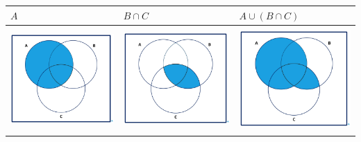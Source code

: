 \documentclass[
  letterpaper,
  DIV=11,
  numbers=noendperiod]{scrreprt}
\begin{document}
\begin{longtable}[]{@{}
  >{\centering\arraybackslash}p{}
  >{\centering\arraybackslash}p{}
  >{\centering\arraybackslash}p{}@{}}
\toprule\noalign{}
\begin{minipage}[b]{\linewidth}\centering
\(A\)
\end{minipage} & \begin{minipage}[b]{\linewidth}\centering
\(B\cap C\)
\end{minipage} & \begin{minipage}[b]{\linewidth}\centering
\(A\cup (B\cap C)\)
\end{minipage} \\
\midrule\noalign{}
\endhead
\bottomrule\noalign{}
\endlastfoot
\includegraphics[width=\linewidth,height=1.5625in,keepaspectratio]{Images/venn1A.jpeg}
&
\includegraphics[width=\linewidth,height=1.5625in,keepaspectratio]{Images/venn1ByC.jpeg}
&
\includegraphics[width=\linewidth,height=1.5625in,keepaspectratio]{Images/venn1AUByC.jpeg} \\
\end{longtable}
\end{document}
